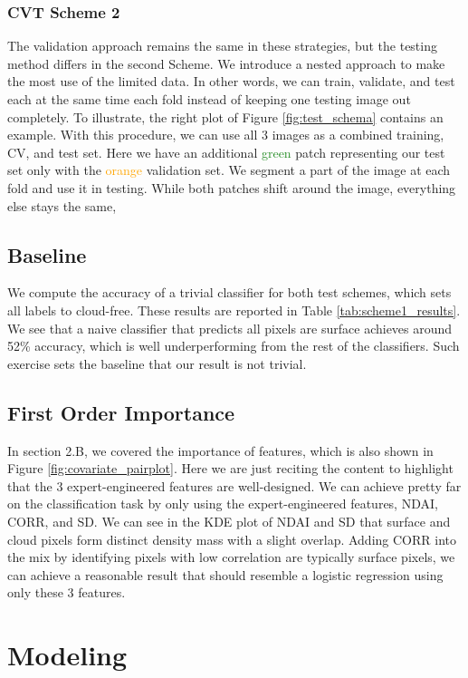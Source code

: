 \documentclass[11pt, letterpaper, journal]{IEEEtran}
\begin{document}
\subsubsection{CVT Scheme 2}
The validation approach remains the same in these strategies, but the testing method differs in the second Scheme. We introduce a nested approach to make the most use of the limited data. In other words, we can train, validate, and test each at the same time each fold instead of keeping one testing image out completely. To illustrate, the right plot of Figure \ref{fig:test_schema} contains an example. With this procedure, we can use all 3 images as a combined training, CV, and test set. Here we have an additional \textcolor{ForestGreen}{green} patch representing our test set only with the \textcolor{orange}{orange} validation set. We segment a part of the image at each fold and use it in testing. While both patches shift around the image, everything else stays the same, 

\subsection{Baseline}
We compute the accuracy of a trivial classifier for both test schemes, which sets all labels to cloud-free. These results are reported in Table \ref{tab:scheme1_results}. We see that a naive classifier that predicts all pixels are surface achieves around 52\% accuracy, which is well underperforming from the rest of the classifiers. Such exercise sets the baseline that our result is not trivial.

\subsection{First Order Importance}
In section 2.B, we covered the importance of features, which is also shown in Figure \ref{fig:covariate_pairplot}. Here we are just reciting the content to highlight that the 3 expert-engineered features are well-designed. We can achieve pretty far on the classification task by only using the expert-engineered features, NDAI, CORR, and SD. We can see in the KDE plot of NDAI and SD that surface and cloud pixels form distinct density mass with a slight overlap. Adding CORR into the mix by identifying pixels with low correlation are typically surface pixels, we can achieve a reasonable result that should resemble a logistic regression using only these 3 features.


\section{Modeling}
\end{document}
